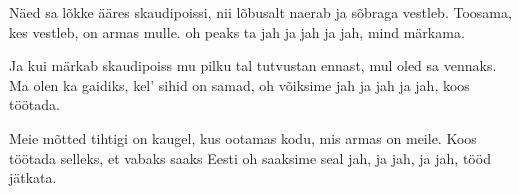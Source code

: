 N\"aed sa l\~okke \"a\"ares skaudipoissi,
nii l\~obusalt naerab ja s\~obraga vestleb.
Toosama, kes vestleb, on armas mulle.
oh peaks ta jah ja jah ja jah,
mind m\"arkama.

Ja kui m\"arkab skaudipoiss mu pilku
tal tutvustan ennast, mul oled sa vennaks.
Ma olen ka gaidiks, kel' sihid on samad,
oh v\~oiksime  jah ja jah ja jah,
koos t\"o\"otada.

Meie m\~otted tihtigi on kaugel,
kus ootamas kodu, mis armas on meile.
Koos t\"o\"otada selleks, et vabaks saaks Eesti
oh saaksime seal jah, ja jah, ja jah,
t\"o\"od j\"atkata.
